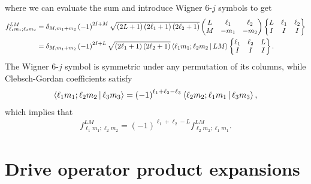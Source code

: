 \documentclass[nofootinbib,notitlepage,11pt]{revtex4-2}
\newcommand{\p}[1]{\left(#1\right)} %
\newcommand{\bk}{\Braket} %
\newcommand{\1}{\mathds{1}}
\begin{document}
where we can evaluate the sum and introduce Wigner 6-$j$ symbols to
get
\begin{align}
  f_{\ell_1 m_1;\ell_2 m_2}^{LM}
  &= \delta_{M,m_1+m_2} \p{-1}^{2I+M}
  \sqrt{\p{2L+1}\p{2\ell_1+1}\p{2\ell_2+1}}
  \begin{pmatrix}
    L & \ell_1 & \ell_2 \\
    M & -m_1 & -m_2
  \end{pmatrix}
  \begin{Bmatrix}
    L & \ell_1 & \ell_2 \\
    I & I & I
  \end{Bmatrix} \\
  &= \delta_{M,m_1+m_2} \p{-1}^{2I+L}
  \sqrt{\p{2\ell_1+1}\p{2\ell_2+1}}
  \bk{\ell_1 m_1; \ell_2 m_2| LM}
  \begin{Bmatrix}
    \ell_1 & \ell_2 & L \\
    I & I & I
  \end{Bmatrix}.
  \label{eq:trans_prod}
\end{align}
The Wigner 6-$j$ symbol is symmetric under any permutation of its
columns, while Clebsch-Gordan coefficients satisfy
\begin{align}
  \bk{\ell_1 m_1; \ell_2 m_2| \ell_3 m_3}
  = \p{-1}^{\ell_1+\ell_2-\ell_3}
  \bk{\ell_2 m_2; \ell_1 m_1| \ell_3 m_3},
\end{align}
which implies that
\begin{align}
  f_{\ell_1 m_1;\ell_2 m_2}^{LM}
  = \p{-1}^{\ell_1+\ell_2-L} f_{\ell_2 m_2;\ell_1 m_1}^{LM}.
\end{align}

\section{Drive operator product expansions}
\label{sec:drive_prod}
\end{document}
